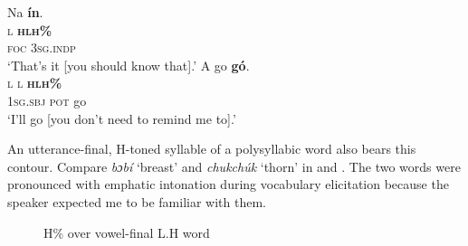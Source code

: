 \ea\label{ex:key:84}
\glll Na  \textbf{ín}.\\
\textsc{l}  \textbf{\textsc{h}}\textbf{\textsc{lh\%}}\\
\textsc{foc}  \textsc{3sg.indp}\\
\glt   ‘That’s it [you should know that].’
\z
\ea\label{ex:key:85}
\glll    A    go  \textbf{gó}.  \\
\textsc{l}    \textsc{l}  \textbf{\textsc{h}}\textbf{\textsc{lh\%}}\\
\textsc{1sg.sbj}  \textsc{pot}  go\\
\glt   ‘I’ll go [you don’t need to remind me to].’ 
\z

An utterance-final, H-toned syllable of a polysyllabic word also bears this contour. Compare \textit{bɔbí} ‘breast’ and \textit{chukchúk} ‘thorn’ in  and . The two words were pronounced with emphatic intonation during vocabulary elicitation because the speaker expected me to be familiar with them.

\begin{figure}
\caption{H\% over vowel-final L.H word}
\label{fig:key:3.33}
\end{figure}


